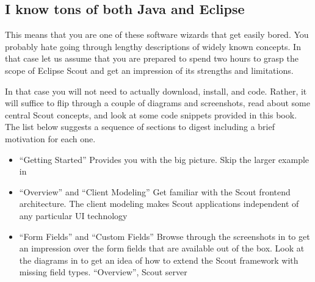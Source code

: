 \documentclass[a4paper,10pt,twoside]{book}
\begin{document}
\subsection{I know tons of both Java and Eclipse}

This means that you are one of these software wizards that get easily bored.
You probably hate going through lengthy descriptions of widely known concepts.
In that case let us assume that you are prepared to spend two hours to grasp the scope of Eclipse Scout and get an impression of its strengths and limitations.

In that case you will not need to actually download, install, and code. 
Rather, it will suffice to flip through a couple of diagrams and screenshots, read about some central Scout concepts, and look at some code snippets provided in this book.
The list below suggests a sequence of sections to digest including a brief motivation for each one.

\begin{itemize}
  \item {} ``Getting Started'' 
      Provides you with the big picture. Skip the larger example in 
  \item {} ``Overview'' and  ``Client Modeling''
      Get familiar with the Scout frontend architecture. 
	  The client modeling makes Scout applications independent of any particular UI technology
  \item {} ``Form Fields'' and  ``Custom Fields''
      Browse through the screenshots in  to get an impression over the form fields that are available out of the box. 
	  Look at the diagrams in  to get an idea of how to extend the Scout framework with missing field types.
   ``Overview'',  Scout server
\end{itemize}
\end{document}
